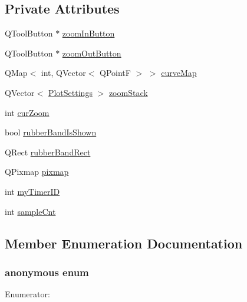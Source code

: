\subsection*{\-Private \-Attributes}
\begin{DoxyCompactItemize}
\item 
\-Q\-Tool\-Button $\ast$ \hyperlink{class_plotter_a82b0e067ea3826befaec3ec5206770d7}{zoom\-In\-Button}
\item 
\-Q\-Tool\-Button $\ast$ \hyperlink{class_plotter_a7a8edab1f66b7cccc195201aab969d56}{zoom\-Out\-Button}
\item 
\-Q\-Map$<$ int, \-Q\-Vector$<$ \-Q\-Point\-F $>$ $>$ \hyperlink{class_plotter_af35afcf49655837b654c631b85443665}{curve\-Map}
\item 
\-Q\-Vector$<$ \hyperlink{class_plot_settings}{\-Plot\-Settings} $>$ \hyperlink{class_plotter_a55ba032505163dce539c667debbcde2e}{zoom\-Stack}
\item 
int \hyperlink{class_plotter_aad79a663e9f42f43a824be11069e00de}{cur\-Zoom}
\item 
bool \hyperlink{class_plotter_a4b80b6ad016ef03736a208699c7d37a3}{rubber\-Band\-Is\-Shown}
\item 
\-Q\-Rect \hyperlink{class_plotter_a1ae97c53cd344c2abde0811fc9814093}{rubber\-Band\-Rect}
\item 
\-Q\-Pixmap \hyperlink{class_plotter_a9fb6f7f3af672b4d8bc43a4e1f7fbbbc}{pixmap}
\item 
int \hyperlink{class_plotter_a5984542f00fe574aaf1bf6fbdbd7428a}{my\-Timer\-I\-D}
\item 
int \hyperlink{class_plotter_a8aad7ebc11a37e83511920648c4c0c43}{sample\-Cnt}
\end{DoxyCompactItemize}


\subsection{\-Member \-Enumeration \-Documentation}
\hypertarget{class_plotter_a9e77c5b581af48fbcf2b876c08f1e32c}{\subsubsection[{anonymous enum}]{\setlength{\rightskip}{0pt plus 5cm}anonymous enum}}\label{class_plotter_a9e77c5b581af48fbcf2b876c08f1e32c}
\begin{Desc}
\item[\-Enumerator\-: ]\par
\begin{description}
\item[{\em 
\hypertarget{class_plotter_a9e77c5b581af48fbcf2b876c08f1e32ca020d9897a6cebf24a7862abf26c748aa}{\-Margin}\label{class_plotter_a9e77c5b581af48fbcf2b876c08f1e32ca020d9897a6cebf24a7862abf26c748aa}
}]\end{description}
\end{Desc}



